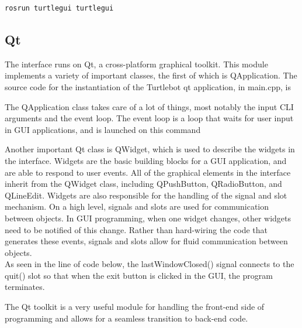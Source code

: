 \documentclass[12]{article}
\begin{document}
\begin{lstlisting}[style=bash]
rosrun turtlegui turtlegui
\end{lstlisting}
\subsection{Qt}
The interface runs on Qt, a cross-platform graphical toolkit. 
This module implements a variety of important classes, the first of which is QApplication. 
The source code for the instantiation of the Turtlebot qt application, in main.cpp, is


The QApplication class takes care of a lot of things, most notably the input CLI arguments and the event loop. The event loop is a loop that waits for user input in GUI applications, and is launched on this command


Another important Qt class is QWidget, which is used to describe the widgets in the interface. Widgets are the basic building blocks for a GUI application, and are able to respond to user events. All of the graphical elements in the interface inherit from the QWidget class, including QPushButton, QRadioButton, and QLineEdit. Widgets are also responsible for the handling of the signal and slot mechanism. On a high level, signals and slots are used for communication between objects. In GUI programming, when one widget changes, other widgets need to be notified of this change. Rather than hard-wiring the code that generates these events, signals and slots allow for fluid communication between objects.\\ 

As seen in the line of code below, the lastWindowClosed() signal connects to the quit() slot so that when the exit button is clicked in the GUI, the program terminates.

The Qt toolkit is a very useful module for handling the front-end side of programming and allows for a seamless transition to back-end code.
\end{document}
